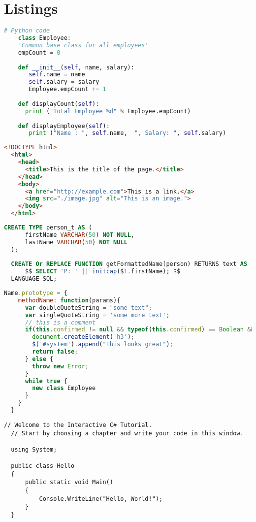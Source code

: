 \hypertarget{listings}{%
\section{Listings}\label{sec:listings}}

\begin{lstlisting}[language=python, caption=Python example]
    # Python code
    class Employee:
    'Common base class for all employees'
    empCount = 0
  
    def __init__(self, name, salary):
       self.name = name
       self.salary = salary
       Employee.empCount += 1
    
    def displayCount(self):
      print ("Total Employee %d" % Employee.empCount)
  
    def displayEmployee(self):
       print ("Name : ", self.name,  ", Salary: ", self.salary)      
  \end{lstlisting}
  
  \begin{lstlisting}[language=HTML, caption=HTML example]
  <!DOCTYPE html>
  <html>
    <head>
      <title>This is the title of the page.</title>
    </head>
    <body>
      <a href="http://example.com">This is a link.</a>
      <img src="./image.jpg" alt="This is an image.">
    </body>
  </html>
  \end{lstlisting}
  
  \begin{lstlisting}[language=SQL, caption=SQL example]
  CREATE TYPE person_t AS (
      firstName VARCHAR(50) NOT NULL,
      lastName VARCHAR(50) NOT NULL
  );
  
  CREATE Or REPLACE FUNCTION getFormattedName(person) RETURNS text AS 
      $$ SELECT 'P: ' || initcap($1.firstName); $$ 
  LANGUAGE SQL;
  \end{lstlisting}
  
  \begin{lstlisting}[language=JavaScript, caption=Javascript example]
  Name.prototype = {
    methodName: function(params){
      var doubleQuoteString = "some text";
      var singleQuoteString = 'some more text';
      // this is a comment
      if(this.confirmed != null && typeof(this.confirmed) == Boolean && this.confirmed == true){
        document.createElement('h3');
        $('#system').append("This looks great");
        return false;
      } else {
        throw new Error;
      }
      while true {
        new class Employee
      }
    }
  }
  \end{lstlisting}
  
  \begin{lstlisting}[language={[Sharp]C}, caption=C\# example]
  // Welcome to the Interactive C# Tutorial.
  // Start by choosing a chapter and write your code in this window.
  
  using System;
  
  public class Hello
  {
      public static void Main()
      {
          Console.WriteLine("Hello, World!");
      }
  }
  \end{lstlisting}
  
